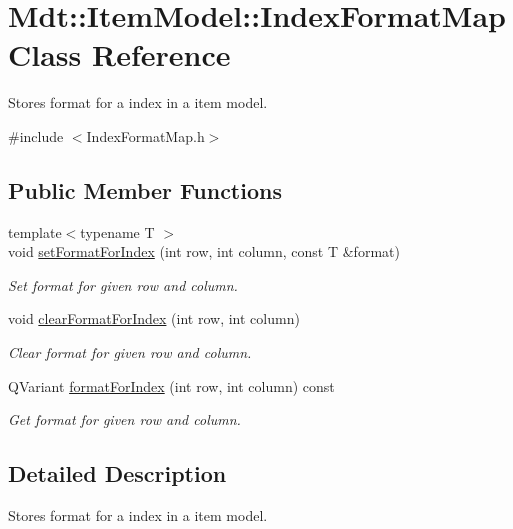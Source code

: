 \hypertarget{class_mdt_1_1_item_model_1_1_index_format_map}{}\section{Mdt\+:\+:Item\+Model\+:\+:Index\+Format\+Map Class Reference}
\label{class_mdt_1_1_item_model_1_1_index_format_map}


Stores format for a index in a item model.  




{\ttfamily \#include $<$Index\+Format\+Map.\+h$>$}

\subsection*{Public Member Functions}
\begin{DoxyCompactItemize}
\item 
{\footnotesize template$<$typename T $>$ }\\void \hyperlink{class_mdt_1_1_item_model_1_1_index_format_map_a8611d26ab8515dd39b99860fc8ba99be}{set\+Format\+For\+Index} (int row, int column, const T \&format)
\begin{DoxyCompactList}\small\item\em Set format for given row and column. \end{DoxyCompactList}\item 
void \hyperlink{class_mdt_1_1_item_model_1_1_index_format_map_ae56d0e8a8adc78a44f905414ee5003f0}{clear\+Format\+For\+Index} (int row, int column)
\begin{DoxyCompactList}\small\item\em Clear format for given row and column. \end{DoxyCompactList}\item 
Q\+Variant \hyperlink{class_mdt_1_1_item_model_1_1_index_format_map_a9f5f54b1d2e541190306505238100276}{format\+For\+Index} (int row, int column) const 
\begin{DoxyCompactList}\small\item\em Get format for given row and column. \end{DoxyCompactList}\end{DoxyCompactItemize}


\subsection{Detailed Description}
Stores format for a index in a item model. 


